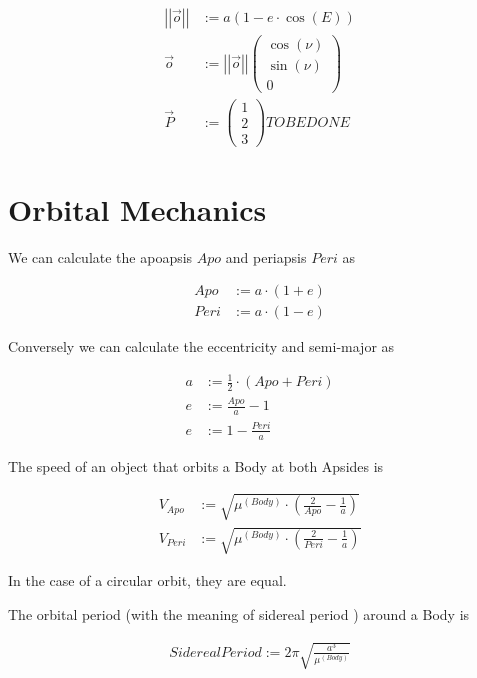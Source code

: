 \documentclass[11pt]{article}
\newcommand{\oa}[1]{\overrightarrow{#1}}
\newcommand{\Pos}{\oa{P}}
\newcommand{\absvec}[1]{\left|\left|{#1}\right|\right|}
\newcommand{\dddvec}[3]{\left(\begin{smallmatrix}{#1}\\{#2}\\{#3}\end{smallmatrix}\right)}
\begin{document}
\begin{align}
  \absvec{\oa{o}} & := a(1-e \cdot \cos(E))\\
  \oa{o} & := \absvec{\oa{o}} \dddvec{\cos(\nu)}{\sin(\nu)}{0}\\
  \Pos & := \dddvec{1}{2}{3} TO BE DONE
\end{align}


\section{Orbital Mechanics}

We can calculate the apoapsis $Apo$ and periapsis $Peri$ as

\begin{align}
Apo & := a \cdot (1 + e)\\
Peri & := a \cdot (1 - e)
\end{align}

Conversely we can calculate the eccentricity and semi-major as

\begin{align}
  a & := \frac{1}{2}\cdot(Apo + Peri)\\
  e & := \frac{Apo}{a} - 1\\
  e & := 1 - \frac{Peri}{a}
\end{align}

The speed of an object that orbits a Body at both Apsides is

\begin{align}
V_{Apo} & := \sqrt{\mu^{(Body)} \cdot \left(\frac{2}{Apo} - \frac{1}{a}\right)}\\
V_{Peri} & := \sqrt{\mu^{(Body)} \cdot\left(\frac{2}{Peri} - \frac{1}{a}\right)}
\end{align}

In the case of a circular orbit, they are equal.

The orbital period (with the meaning of sidereal period \cite{SIDPER}) around a Body is

\begin{align}
SiderealPeriod := 2\pi\sqrt{\frac{a^3}{\mu^{(Body)}}}
\end{align}
\end{document}
